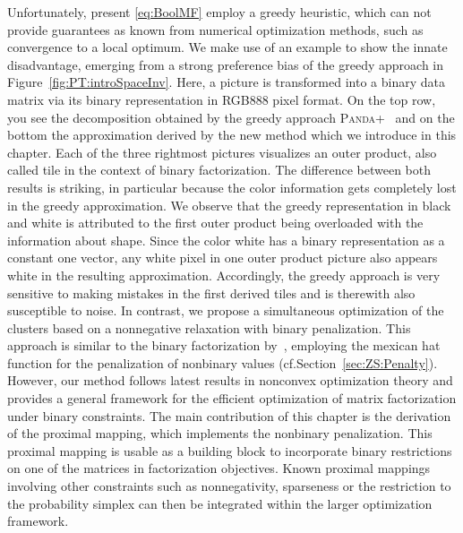 Unfortunately, present \ref{eq:BoolMF} employ a greedy heuristic, which can not provide guarantees as known from numerical optimization methods, such as convergence to a local optimum. We make use of an example to show the innate disadvantage, emerging from a strong preference bias of the greedy approach in Figure~\ref{fig:PT:introSpaceInv}. Here, a picture is transformed into a binary data matrix via its binary representation in RGB888 pixel format. On the top row, you see the decomposition obtained by the greedy approach \textsc{Panda+}~\citep{lucchese2014unifying} and on the bottom the approximation derived by the new method which we introduce in this chapter. Each of the three rightmost pictures visualizes an outer product, also called tile in the context of binary factorization. The difference between both results is striking, in particular because the color information gets completely lost in the greedy approximation. We observe that the greedy representation in black and white is attributed to the first outer product being overloaded with the information about shape. Since the color white has a binary representation as a constant one vector, any white pixel in one outer product picture also appears white in the resulting approximation. Accordingly, the greedy approach is very sensitive to making mistakes in the first derived tiles and is therewith also susceptible to noise. In contrast, we propose a simultaneous optimization of the clusters based on a nonnegative relaxation with binary penalization. This approach is similar to the binary factorization by~\cite{zhang2007binary}, employing the mexican hat function for the penalization of nonbinary values (cf.\@ Section~\ref{sec:ZS:Penalty}). However, our method follows latest results in nonconvex optimization theory and provides a general framework for the efficient optimization of matrix factorization under binary constraints. The main contribution of this chapter is the derivation of the proximal mapping, which implements the nonbinary penalization. This proximal mapping is usable as a building block to incorporate binary restrictions on one of the matrices in factorization objectives. Known proximal mappings involving other constraints such as nonnegativity, sparseness or the restriction to the probability simplex can then be integrated within the larger optimization framework.  

